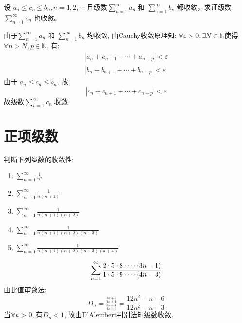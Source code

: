 \begin{problem}
    设 \(a_n \leq c_n \leq b_n, n = 1, 2, \cdots\)
    且级数\(\sum_{n=1}^{\infty} a_n\) 和 \(\sum_{n=1}^{\infty} b_n\) 都收敛，求证级数
    \(\sum_{n=1}^{\infty} c_n\) 也收敛。
\end{problem}

\begin{solution}
    由于\(\sum_{n=1}^{\infty} a_{n}\) 和 \(\sum_{n=1}^{\infty} b_{n}\)
    均收敛, 由Cauchy收敛原理知: \(\forall \varepsilon > 0, \exists N \in
    \mathbb{N}\)使得\(\forall n > N, p \in \mathbb{N}\), 有:
    \begin{align*}
        \left| a_{n} + a_{n+1} + \cdots + a_{n+p} \right| < \varepsilon \\
        \left| b_{n} + b_{n+1} + \cdots + b_{n+p} \right| < \varepsilon
    \end{align*}
    由于
    \(a_{n} \leq c_{n} \leq b_{n}\), 故:
    \[
        \left| c_{n} + c_{n+1} + \cdots + c_{n+p} \right| < \varepsilon
    \]
    故级数\(\sum_{n=1}^{\infty} c_{n}\) 收敛.
\end{solution}

\begin{problem}

\end{problem}

\section{正项级数}
\begin{problem}
    判断下列级数的收敛性:
    \begin{enumerate}
        \item \(\sum_{n=1}^{\infty} \frac{1}{n^2}\)
        \item \(\sum_{n=1}^{\infty} \frac{1}{n(n+1)}\)
        \item \(\sum_{n=1}^{\infty} \frac{1}{n(n+1)(n+2)}\)
        \item \(\sum_{n=1}^{\infty} \frac{1}{n(n+1)(n+2)(n+3)}\)
        \item \(\sum_{n=1}^{\infty} \frac{1}{n(n+1)(n+2)(n+3)(n+4)}\)
    \end{enumerate}
\end{problem}
\[
    \sum_{n=1}^{\infty} \frac{2 \cdot 5 \cdot 8 \cdot \cdots
    (3n-1)}{1 \cdot 5 \cdot 9 \cdot \cdots (4n-3)} \\
\]
由比值审敛法:
\[
    D_{n} = \tfrac{\tfrac{3n+2}{4n+1}}{\tfrac{3n-1}{4n-3}} =
    \frac{12n^{2}-n-6}{12n^{2}-n-3}
\]
当\(\forall n > 0\), 有\(D_{n} < 1\), 故由D'Alembert判别法知级数收敛.

